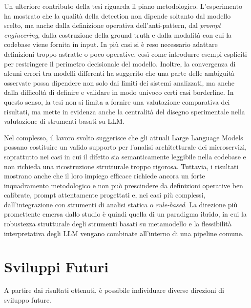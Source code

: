 Un ulteriore contributo della tesi riguarda il piano metodologico. L’esperimento ha mostrato che la qualità della detection non dipende soltanto dal modello scelto, ma anche dalla definizione operativa dell’anti-pattern, dal \textit{prompt engineering}, dalla costruzione della ground truth e dalla modalità con cui la codebase viene fornita in input. In più casi si è reso necessario adattare definizioni troppo astratte o poco operative, così come introdurre esempi espliciti per restringere il perimetro decisionale del modello. Inoltre, la convergenza di alcuni errori tra modelli differenti ha suggerito che una parte delle ambiguità osservate possa dipendere non solo dai limiti dei sistemi analizzati, ma anche dalla difficoltà di definire e validare in modo univoco certi casi borderline. In questo senso, la tesi non si limita a fornire una valutazione comparativa dei risultati, ma mette in evidenza anche la centralità del disegno sperimentale nella valutazione di strumenti basati su LLM.

Nel complesso, il lavoro svolto suggerisce che gli attuali Large Language Models possano costituire un valido supporto per l’analisi architetturale dei microservizi, soprattutto nei casi in cui il difetto sia semanticamente leggibile nella codebase e non richieda una ricostruzione strutturale troppo rigorosa. Tuttavia, i risultati mostrano anche che il loro impiego efficace richiede ancora un forte inquadramento metodologico e non può prescindere da definizioni operative ben calibrate, prompt attentamente progettati e, nei casi più complessi, dall’integrazione con strumenti di analisi statica o \textit{rule-based}. La direzione più promettente emersa dallo studio è quindi quella di un paradigma ibrido, in cui la robustezza strutturale degli strumenti basati su metamodello e la flessibilità interpretativa degli LLM vengano combinate all’interno di una pipeline comune.

\section*{Sviluppi Futuri}

A partire dai risultati ottenuti, è possibile individuare diverse direzioni di sviluppo future.

